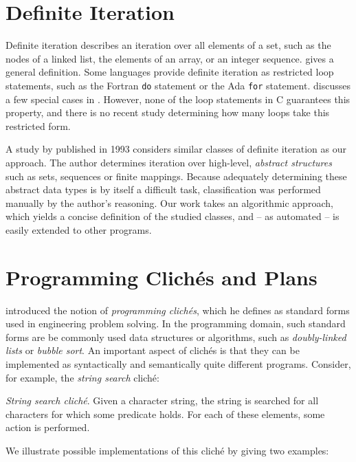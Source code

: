 \section{Definite Iteration}

Definite iteration describes an iteration over all elements of a set, such as the nodes of a linked list, the elements of an array, or an integer sequence. \citeauthor{DBLP:journals/tse/Stavely95} \cite{DBLP:journals/tse/Stavely95} gives a general definition. Some languages provide definite iteration as restricted loop statements, such as the Fortran \verb|do| statement or the Ada \verb|for| statement. \citeauthor{Hoare72} discusses a few special cases in \cite{Hoare72}. However, none of the loop statements in C guarantees this property, and there is no recent study determining how many loops take this restricted form.

A study by \citeauthor{DBLP:journals/jss/Stavely93} \cite{DBLP:journals/jss/Stavely93} published in 1993 considers similar classes of definite iteration as our approach. The author determines iteration over high-level, \emph{abstract structures} such as sets, sequences or finite mappings. Because adequately determining these abstract data types is by itself a difficult task, classification was performed manually by the author's reasoning. Our work takes an algorithmic approach, which yields a concise definition of the studied classes, and -- as automated -- is easily extended to other programs.

\section{Programming Clichés and Plans}

\citeauthor{DBLP:conf/ijcai/Rich81} \cite{DBLP:conf/ijcai/Rich81} introduced the notion of \emph{programming clichés}, which he defines as standard forms used in engineering problem solving. In the programming domain, such standard forms are be commonly used data structures or algorithms, such as \emph{doubly-linked lists} or \emph{bubble sort}. An important aspect of clichés is that they can be implemented as syntactically and semantically quite different programs. Consider, for example, the \emph{string search} cliché:

\emph{String search cliché}. Given a character string, the string is searched for all characters for which some predicate holds. For each of these elements, some action is performed.

We illustrate possible implementations of this cliché by giving two examples:

